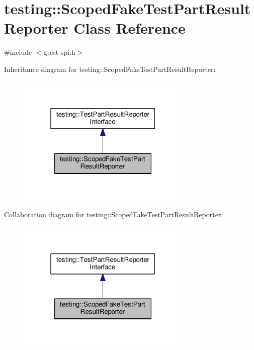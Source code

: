 \hypertarget{classtesting_1_1ScopedFakeTestPartResultReporter}{}\section{testing\+:\+:Scoped\+Fake\+Test\+Part\+Result\+Reporter Class Reference}
\label{classtesting_1_1ScopedFakeTestPartResultReporter}


{\ttfamily \#include $<$gtest-\/spi.\+h$>$}



Inheritance diagram for testing\+:\+:Scoped\+Fake\+Test\+Part\+Result\+Reporter\+:
\nopagebreak
\begin{figure}[H]
\begin{center}
\leavevmode
\includegraphics[width=235pt]{classtesting_1_1ScopedFakeTestPartResultReporter__inherit__graph}
\end{center}
\end{figure}


Collaboration diagram for testing\+:\+:Scoped\+Fake\+Test\+Part\+Result\+Reporter\+:
\nopagebreak
\begin{figure}[H]
\begin{center}
\leavevmode
\includegraphics[width=235pt]{classtesting_1_1ScopedFakeTestPartResultReporter__coll__graph}
\end{center}
\end{figure}
